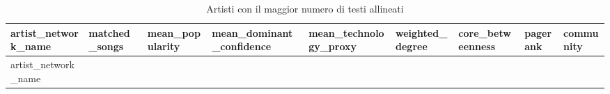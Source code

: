 \documentclass[
]{article}
\begin{document}
\begin{longtable}[]{@{}
  >{\raggedright\arraybackslash}p{}
  >{\raggedleft\arraybackslash}p{}
  >{\raggedleft\arraybackslash}p{}
  >{\raggedleft\arraybackslash}p{}
  >{\raggedleft\arraybackslash}p{}
  >{\raggedleft\arraybackslash}p{}
  >{\raggedleft\arraybackslash}p{}
  >{\raggedleft\arraybackslash}p{}
  >{\raggedright\arraybackslash}p{}@{}}
\caption{Artisti con il maggior numero di testi
allineati}\tabularnewline
\toprule\noalign{}
\begin{minipage}[b]{\linewidth}\raggedright
artist\_network\_name
\end{minipage} & \begin{minipage}[b]{\linewidth}\raggedleft
matched\_songs
\end{minipage} & \begin{minipage}[b]{\linewidth}\raggedleft
mean\_popularity
\end{minipage} & \begin{minipage}[b]{\linewidth}\raggedleft
mean\_dominant\_confidence
\end{minipage} & \begin{minipage}[b]{\linewidth}\raggedleft
mean\_technology\_proxy
\end{minipage} & \begin{minipage}[b]{\linewidth}\raggedleft
weighted\_degree
\end{minipage} & \begin{minipage}[b]{\linewidth}\raggedleft
core\_betweenness
\end{minipage} & \begin{minipage}[b]{\linewidth}\raggedleft
pagerank
\end{minipage} & \begin{minipage}[b]{\linewidth}\raggedright
community
\end{minipage} \\
\midrule\noalign{}
\endfirsthead
\toprule\noalign{}
\begin{minipage}[b]{\linewidth}\raggedright
artist\_network\_name
\end{minipage} & \begin{minipage}[b]{\linewidth}\raggedleft

\end{minipage}
\end{longtable}
\end{document}
